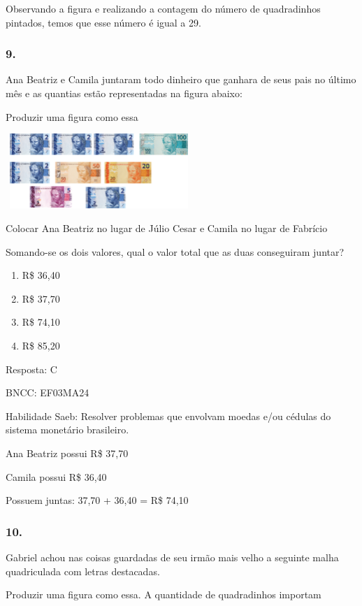 Observando a figura e realizando a contagem do número de quadradinhos
pintados, temos que esse número é igual a 29.

\subsubsection{9.}\label{section-134}

Ana Beatriz e Camila juntaram todo dinheiro que ganhara de seus pais no
último mês e as quantias estão representadas na figura abaixo:

Produzir uma figura como essa

\includegraphics[width=2.77564in,height=1.11703in]{media/image110.png}

Colocar Ana Beatriz no lugar de Júlio Cesar e Camila no lugar de
Fabrício

Somando-se os dois valores, qual o valor total que as duas conseguiram
juntar?

\begin{enumerate}
\def\labelenumi{\alph{enumi})}
\item
  R\$ 36,40
\item
  R\$ 37,70
\item
  R\$ 74,10
\item
  R\$ 85,20
\end{enumerate}

Resposta: C

BNCC: EF03MA24

Habilidade Saeb: Resolver problemas que envolvam moedas e/ou cédulas do
sistema monetário brasileiro.

Ana Beatriz possui R\$ 37,70

Camila possui R\$ 36,40

Possuem juntas: 37,70 + 36,40 = R\$ 74,10

\subsubsection{10.}\label{section-135}

Gabriel achou nas coisas guardadas de seu irmão mais velho a seguinte
malha quadriculada com letras destacadas.

Produzir uma figura como essa. A quantidade de quadradinhos importam


